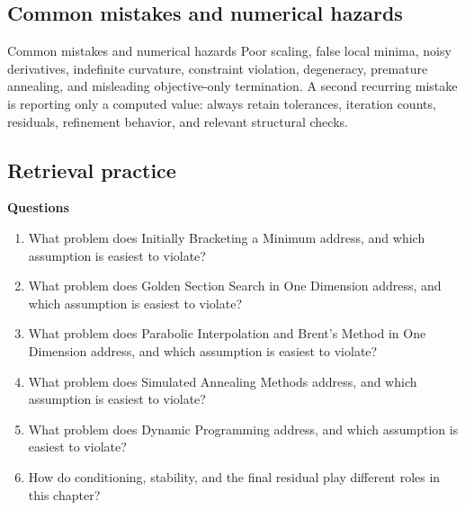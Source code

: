 \documentclass[10pt,letterpaper]{article}
\begin{document}
\subsection*{Common mistakes and numerical hazards}
\begin{warnbox}{Common mistakes and numerical hazards}
Poor scaling, false local minima, noisy derivatives, indefinite curvature, constraint violation, degeneracy, premature annealing, and misleading objective-only termination.  A second recurring mistake is reporting only a computed value: always retain tolerances, iteration counts, residuals, refinement behavior, and relevant structural checks.
\end{warnbox}

\subsection*{Retrieval practice}
\textbf{Questions}
\begin{enumerate}
\item What problem does Initially Bracketing a Minimum address, and which assumption is easiest to violate?
\item What problem does Golden Section Search in One Dimension address, and which assumption is easiest to violate?
\item What problem does Parabolic Interpolation and Brent's Method in One Dimension address, and which assumption is easiest to violate?
\item What problem does Simulated Annealing Methods address, and which assumption is easiest to violate?
\item What problem does Dynamic Programming address, and which assumption is easiest to violate?
\item How do conditioning, stability, and the final residual play different roles in this chapter?
\end{enumerate}
\end{document}
